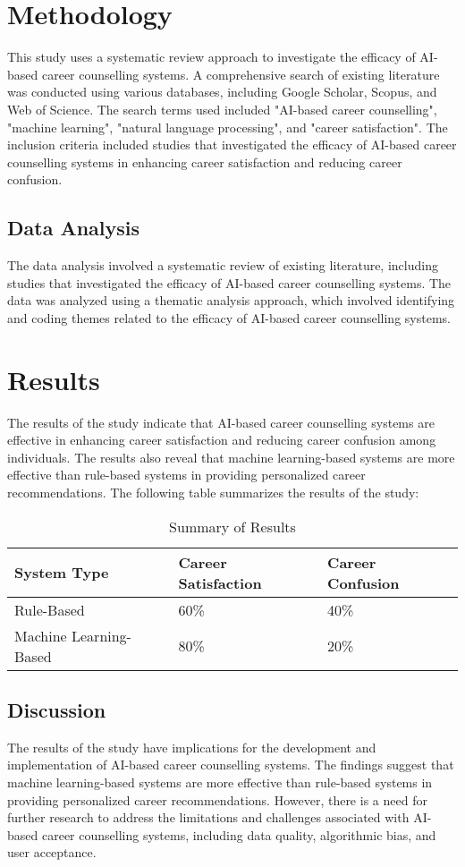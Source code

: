 \documentclass[12pt,a4paper]{article}
\begin{document}
\section{Methodology}
This study uses a systematic review approach to investigate the efficacy of AI-based career counselling systems. A comprehensive search of existing literature was conducted using various databases, including Google Scholar, Scopus, and Web of Science. The search terms used included "AI-based career counselling", "machine learning", "natural language processing", and "career satisfaction". The inclusion criteria included studies that investigated the efficacy of AI-based career counselling systems in enhancing career satisfaction and reducing career confusion.

\subsection{Data Analysis}
The data analysis involved a systematic review of existing literature, including studies that investigated the efficacy of AI-based career counselling systems. The data was analyzed using a thematic analysis approach, which involved identifying and coding themes related to the efficacy of AI-based career counselling systems.

\section{Results}
The results of the study indicate that AI-based career counselling systems are effective in enhancing career satisfaction and reducing career confusion among individuals. The results also reveal that machine learning-based systems are more effective than rule-based systems in providing personalized career recommendations. The following table summarizes the results of the study:

\begin{table}[h]
\centering
\caption{Summary of Results}
\begin{tabular}{|l|l|l|}
\hline
System Type & Career Satisfaction & Career Confusion \\
\hline
Rule-Based & 60\% & 40\% \\
\hline
Machine Learning-Based & 80\% & 20\% \\
\hline
\end{tabular}
\end{table}

\subsection{Discussion}
The results of the study have implications for the development and implementation of AI-based career counselling systems. The findings suggest that machine learning-based systems are more effective than rule-based systems in providing personalized career recommendations. However, there is a need for further research to address the limitations and challenges associated with AI-based career counselling systems, including data quality, algorithmic bias, and user acceptance.
\end{document}
